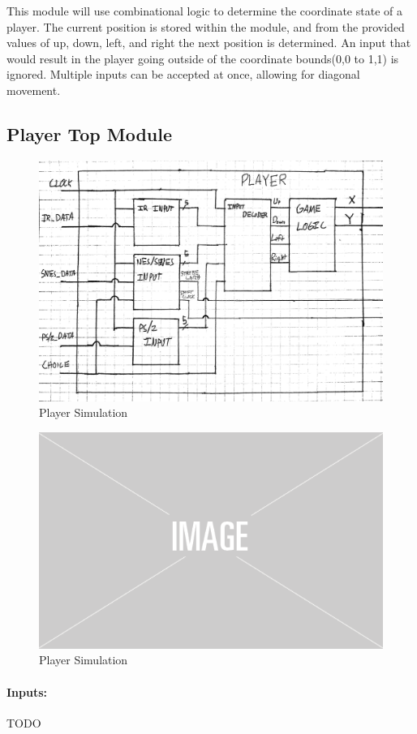 \documentclass[]{article}
\begin{document}
This module will use combinational logic to determine the coordinate state of a player. The current position is stored within the module, and from the provided values of up, down, left, and right the next position is determined. An input that would result in the player going outside of the coordinate bounds(0,0 to 1,1) is ignored. Multiple inputs can be accepted at once, allowing for diagonal movement.  

\subsection{Player Top Module}
\begin{figure}[H]\centering
    \includegraphics[width=\linewidth]{figures/Player_Block.jpg}
    \caption{Player Simulation}
    \label{fig:irParserBlock}
\end{figure}
\begin{figure}[H]\centering
    \includegraphics[width=0.5\linewidth]{figures/placeholder.png}
    \caption{Player Simulation}
    \label{fig:irParserSim}
\end{figure}
\paragraph{Inputs:} TODO
\end{document}
